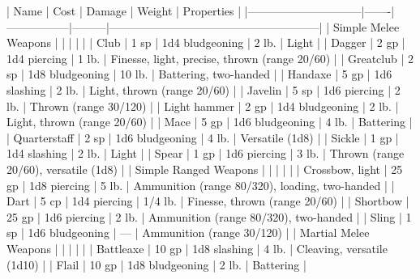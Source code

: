 | Name                         | Cost  | Damage          | Weight  | Properties                                             |
|------------------------------|-------|-----------------|---------|--------------------------------------------------------|
| Simple Melee Weapons   |       |                 |         |                                                        |
| Club                         | 1 sp  | 1d4 bludgeoning | 2 lb.   | Light                                                  |
| Dagger                       | 2 gp  | 1d4 piercing    | 1 lb.   | Finesse, light, precise, thrown (range 20/60)          |
| Greatclub                    | 2 sp  | 1d8 bludgeoning | 10 lb.  | Battering, two-handed                                  |
| Handaxe                      | 5 gp  | 1d6 slashing    | 2 lb.   | Light, thrown (range 20/60)                            |
| Javelin                      | 5 sp  | 1d6 piercing    | 2 lb.   | Thrown (range 30/120)                                  |
| Light hammer                 | 2 gp  | 1d4 bludgeoning | 2 lb.   | Light, thrown (range 20/60)                            |
| Mace                         | 5 gp  | 1d6 bludgeoning | 4 lb.   | Battering                                              |
| Quarterstaff                 | 2 sp  | 1d6 bludgeoning | 4 lb.   | Versatile (1d8)                                        |
| Sickle                       | 1 gp  | 1d4 slashing    | 2 lb.   | Light                                                  |
| Spear                        | 1 gp  | 1d6 piercing    | 3 lb.   | Thrown (range 20/60), versatile (1d8)                  |
| Simple Ranged Weapons  |       |                 |         |                                                        |
| Crossbow, light              | 25 gp | 1d8 piercing    | 5 lb.   | Ammunition (range 80/320), loading, two-handed         |
| Dart                         | 5 cp  | 1d4 piercing    | 1/4 lb. | Finesse, thrown (range 20/60)                          |
| Shortbow                     | 25 gp | 1d6 piercing    | 2 lb.   | Ammunition (range 80/320), two-handed                  |
| Sling                        | 1 sp  | 1d6 bludgeoning | —       | Ammunition (range 30/120)                              |
| Martial Melee Weapons  |       |                 |         |                                                        |
| Battleaxe                    | 10 gp | 1d8 slashing    | 4 lb.   | Cleaving, versatile (1d10)                             |
| Flail                        | 10 gp | 1d8 bludgeoning | 2 lb.   | Battering                                              |
